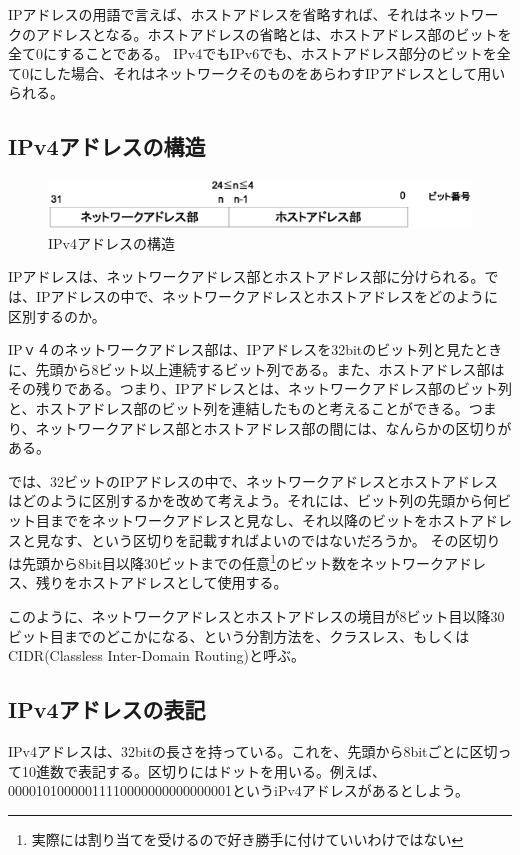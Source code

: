 IPアドレスの用語で言えば、ホストアドレスを省略すれば、それはネットワークのアドレスとなる。ホストアドレスの省略とは、ホストアドレス部のビットを全て0にすることである。
IPv4でもIPv6でも、ホストアドレス部分のビットを全て0にした場合、それはネットワークそのものをあらわすIPアドレスとして用いられる。

\subsection{IPv4アドレスの構造}

\begin{figure}[htbp]
	\includegraphics[width=12cm,clip]{draw/ipaddr.eps}
	\caption{IPv4アドレスの構造}
	\label{fig:ipaddr}
\end{figure}

IPアドレスは、ネットワークアドレス部とホストアドレス部に分けられる。では、IPアドレスの中で、ネットワークアドレスとホストアドレスをどのように区別するのか。

IPｖ４のネットワークアドレス部は、IPアドレスを32bitのビット列と見たときに、先頭から8ビット以上連続するビット列である。また、ホストアドレス部はその残りである。つまり、IPアドレスとは、ネットワークアドレス部のビット列と、ホストアドレス部のビット列を連結したものと考えることができる。つまり、ネットワークアドレス部とホストアドレス部の間には、なんらかの区切りがある。

では、32ビットのIPアドレスの中で、ネットワークアドレスとホストアドレスはどのように区別するかを改めて考えよう。それには、ビット列の先頭から何ビット目までをネットワークアドレスと見なし、それ以降のビットをホストアドレスと見なす、という区切りを記載すればよいのではないだろうか。
その区切りは先頭から8bit目以降30ビットまでの任意\footnote{実際には割り当てを受けるので好き勝手に付けていいわけではない}のビット数をネットワークアドレス、残りをホストアドレスとして使用する。

このように、ネットワークアドレスとホストアドレスの境目が8ビット目以降30ビット目までのどこかになる、という分割方法を、クラスレス、もしくはCIDR(Classless Inter-Domain Routing)と呼ぶ。

\subsection{IPv4アドレスの表記}
IPv4アドレスは、32bitの長さを持っている。これを、先頭から8bitごとに区切って10進数で表記する。区切りにはドットを用いる。例えば、00001010000011110000000000000001というiPv4アドレスがあるとしよう。


